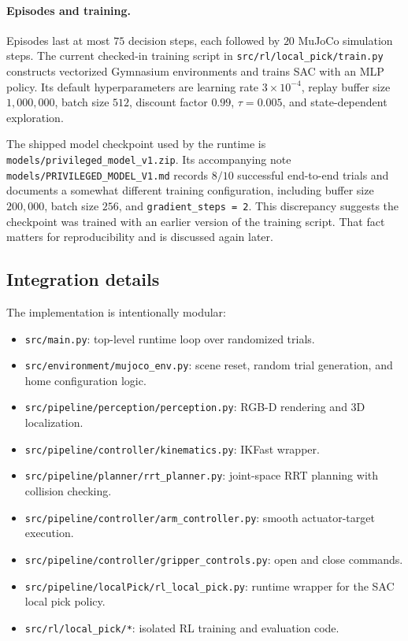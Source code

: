 \documentclass[11pt]{article}
\begin{document}
\paragraph{Episodes and training.}
Episodes last at most \(75\) decision steps, each followed by \(20\) MuJoCo simulation steps. The current checked-in training script in \texttt{src/rl/local\_pick/train.py} constructs vectorized Gymnasium environments and trains SAC with an MLP policy. Its default hyperparameters are learning rate \(3 \times 10^{-4}\), replay buffer size \(1{,}000{,}000\), batch size \(512\), discount factor \(0.99\), \(\tau = 0.005\), and state-dependent exploration.

The shipped model checkpoint used by the runtime is \texttt{models/privileged\_model\_v1.zip}. Its accompanying note \texttt{models/PRIVILEGED\_MODEL\_V1.md} records \(8/10\) successful end-to-end trials and documents a somewhat different training configuration, including buffer size \(200{,}000\), batch size \(256\), and \texttt{gradient\_steps = 2}. This discrepancy suggests the checkpoint was trained with an earlier version of the training script. That fact matters for reproducibility and is discussed again later.

\subsection{Integration details}

The implementation is intentionally modular:
\begin{itemize}[leftmargin=*]
    \item \texttt{src/main.py}: top-level runtime loop over randomized trials.
    \item \texttt{src/environment/mujoco\_env.py}: scene reset, random trial generation, and home configuration logic.
    \item \texttt{src/pipeline/perception/perception.py}: RGB-D rendering and 3D localization.
    \item \texttt{src/pipeline/controller/kinematics.py}: IKFast wrapper.
    \item \texttt{src/pipeline/planner/rrt\_planner.py}: joint-space RRT planning with collision checking.
    \item \texttt{src/pipeline/controller/arm\_controller.py}: smooth actuator-target execution.
    \item \texttt{src/pipeline/controller/gripper\_controls.py}: open and close commands.
    \item \texttt{src/pipeline/localPick/rl\_local\_pick.py}: runtime wrapper for the SAC local pick policy.
    \item \texttt{src/rl/local\_pick/*}: isolated RL training and evaluation code.
\end{itemize}
\end{document}
